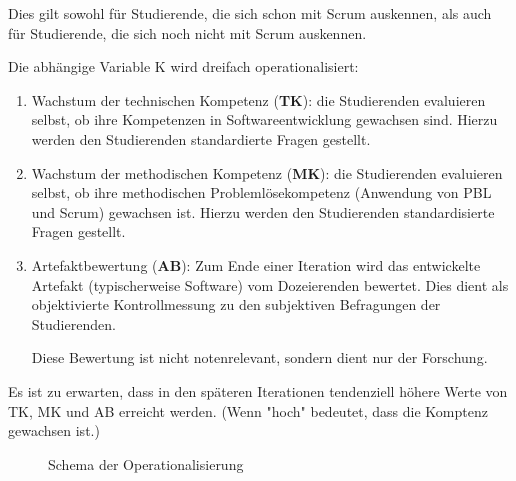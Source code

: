 \documentclass[a4paper,12pt]{article}
\begin{document}
Dies gilt sowohl für Studierende, die sich schon mit Scrum auskennen, als auch für Studierende, die sich noch nicht mit Scrum auskennen.

Die abhängige Variable K wird dreifach operationalisiert:
\begin{enumerate}
    \item Wachstum der technischen Kompetenz (\textbf{TK}): die Studierenden evaluieren selbst, ob ihre Kompetenzen in Softwareentwicklung gewachsen sind. Hierzu werden den Studierenden standardierte Fragen gestellt.
    \item Wachstum der methodischen Kompetenz (\textbf{MK}): die Studierenden evaluieren selbst, ob ihre methodischen Problemlösekompetenz (Anwendung von PBL und Scrum) gewachsen ist. Hierzu werden den Studierenden standardisierte Fragen gestellt.
    \item Artefaktbewertung (\textbf{AB}): Zum Ende einer Iteration wird das entwickelte Artefakt (typischerweise Software) vom Dozeierenden bewertet. Dies dient als objektivierte Kontrollmessung zu den subjektiven Befragungen der Studierenden. 
    
    Diese Bewertung ist nicht notenrelevant, sondern dient nur der Forschung.
\end{enumerate}

Es ist zu erwarten, dass in den späteren Iterationen tendenziell höhere Werte von TK, MK und AB erreicht werden. (Wenn "hoch" bedeutet, dass die Komptenz gewachsen ist.)

\begin{figure}[h]
\begin{center}
    \caption{Schema der Operationalisierung}
\end{center}
\end{figure}
\end{document}
